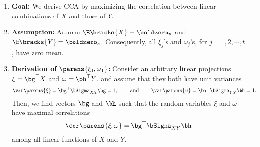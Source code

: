 \documentclass[12pt]{article}
\begin{document}
\begin{enumerate}[label=\textbf{\arabic*.}]

	\item \textbf{Goal:} We derive CCA by maximizing the correlation between linear combinations of $X$ and those of $Y$. 
	
	\item \textbf{Assumption:} Assume $\E \bracks{X} = \boldzero_p$ and $\E \bracks{Y} = \boldzero_s$. Consequently, all $\xi_j$'s and $\omega_j$'s, for $j = 1, 2, \cdots, t$, have zero mean. 

	\item \textbf{Derivation of $\parens{\xi_1, \omega_1}$:} Consider an arbitrary linear projections $\xi = \bg^\top X$ and $\omega = \bh^\top Y$, and assume that they both have unit variances 
	\begin{align}
		\var \parens{\xi} = \bg^\top \bSigma_{XX} \bg = 1, \qquad \text{ and } \qquad \var \parens{\omega} = \bh^\top \bSigma_{YY} \bh = 1. 
	\end{align}
	Then, we find vectors $\bg$ and $\bh$ such that the random variables $\xi$ and $\omega$ have maximal correlations 
	\begin{align}
		\cor \parens{\xi, \omega} = \bg^\top \bSigma_{XY} \bh
	\end{align}
	among all linear functions of $X$ and $Y$. 
	

\end{enumerate}
\end{document}
